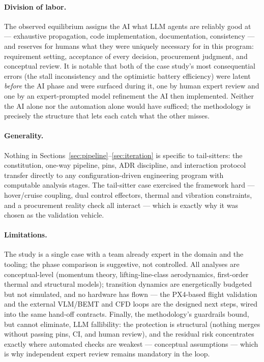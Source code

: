 \paragraph{Division of labor.} The observed equilibrium assigns the
AI what LLM agents are reliably good at --- exhaustive propagation,
code implementation, documentation, consistency --- and reserves for
humans what they were uniquely necessary for in this program:
requirement setting, acceptance of every decision, procurement
judgment, and conceptual review. It is notable that both of the case
study's most consequential errors (the stall inconsistency and the
optimistic battery efficiency) were latent \emph{before} the AI phase
and were surfaced during it, one by human expert review and one by an
expert-prompted model refinement the AI then implemented. Neither the
AI alone nor the automation alone would have sufficed; the methodology
is precisely the structure that lets each catch what the other misses.

\paragraph{Generality.} Nothing in
Sections~\ref{sec:pipeline}--\ref{sec:iteration} is specific to
tail-sitters: the constitution, one-way pipeline, pins, ADR
discipline, and interaction protocol transfer directly to any
configuration-driven engineering program with computable analysis
stages. The tail-sitter case exercised the framework hard ---
hover/cruise coupling, dual control effectors, thermal and vibration
constraints, and a procurement reality check all interact --- which is
exactly why it was chosen as the validation vehicle.

\paragraph{Limitations.} The study is a single case with a team
already expert in the domain and the tooling; the phase comparison is
suggestive, not controlled. All analyses are conceptual-level
(momentum theory, lifting-line-class aerodynamics, first-order thermal
and structural models); transition dynamics are energetically budgeted
but not simulated, and no hardware has flown --- the PX4-based flight
validation and the external VLM/BEMT and CFD loops are the designed
next steps, wired into the same hand-off contracts. Finally, the
methodology's guardrails bound, but cannot eliminate, LLM
fallibility: the protection is structural (nothing merges without
passing pins, CI, and human review), and the residual risk
concentrates exactly where automated checks are weakest ---
conceptual assumptions --- which is why independent expert review
remains mandatory in the loop.
